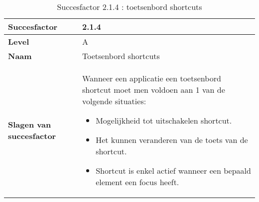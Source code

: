 \begin{table}[H]
    \centering
    \caption{Succesfactor 2.1.4 : toetsenbord shortcuts}
    \hspace*{-1cm}\begin{tabular}{|l|p{12cm}|} 
        \hline
        \textbf{Succesfactor}                 & 2.1.4                                                                                                                                                                                                                                                                                                                                                                                                                                                                                                             \\ 
        \hline
        \textbf{Level}                        & A                                                                                                                                                                                                                                                                                                                                                                                                                                                                                                                \\ 
        \hline
        \textbf{Naam}                         & Toetsenbord shortcuts ~                                                                                                                                                                                                                                                                                                                                                                                                                                                                                      \\ 
        \hline
        \textbf{Slagen van succesfactor}      & Wanneer een applicatie een toetsenbord shortcut moet men voldoen aan 1 van de volgende situaties: \begin{itemize}
            \item Mogelijkheid tot uitschakelen shortcut.
            \item Het kunnen veranderen van de toets van de shortcut.
            \item Shortcut is enkel actief wanneer een bepaald element een focus heeft.

\end{itemize}
\end{tabular}
\end{table}
